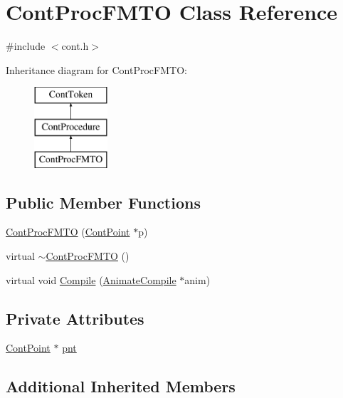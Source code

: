 \hypertarget{a00071}{\section{Cont\-Proc\-F\-M\-T\-O Class Reference}
\label{a00071}
}


{\ttfamily \#include $<$cont.\-h$>$}

Inheritance diagram for Cont\-Proc\-F\-M\-T\-O\-:\begin{figure}[H]
\begin{center}
\leavevmode
\includegraphics[height=3.000000cm]{a00071}
\end{center}
\end{figure}
\subsection*{Public Member Functions}
\begin{DoxyCompactItemize}
\item 
\hyperlink{a00071_a10727448ea9cb40eec436b7abe2d4675}{Cont\-Proc\-F\-M\-T\-O} (\hyperlink{a00062}{Cont\-Point} $\ast$p)
\item 
virtual \hyperlink{a00071_a4f17ce279104980b43974e4f953b6d9a}{$\sim$\-Cont\-Proc\-F\-M\-T\-O} ()
\item 
virtual void \hyperlink{a00071_ae91ffc85c8a43412ee3164dd3c14be7d}{Compile} (\hyperlink{a00007}{Animate\-Compile} $\ast$anim)
\end{DoxyCompactItemize}
\subsection*{Private Attributes}
\begin{DoxyCompactItemize}
\item 
\hyperlink{a00062}{Cont\-Point} $\ast$ \hyperlink{a00071_aa39384486319e7ed072a35c1cbe6647b}{pnt}
\end{DoxyCompactItemize}
\subsection*{Additional Inherited Members}


